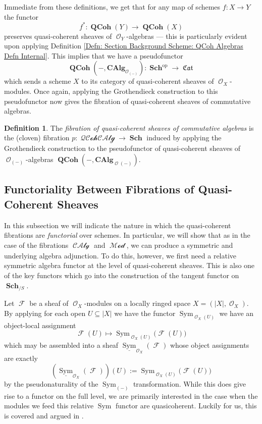 \documentclass{amsart}
\theoremstyle{definition}
\newtheorem{definition}[equation]{Definition}
\DeclareMathOperator{\Fscr}{\mathscr{F}}
\DeclareMathOperator{\Ocal}{\mathcal{O}}
\DeclareMathOperator{\sym}{Sym}
\DeclareMathOperator{\fCat}{\mathfrak{Cat}}
\DeclareMathOperator{\op}{op}
\DeclareMathOperator{\MMod}{\mathcal{Mod}}
\DeclareMathOperator{\CCalg}{\mathcal{CAlg}}
\newcommand{\CAlg}[1]{\mathbf{CAlg}_{#1}}
\newcommand{\Sym}[1]{\sym_{#1}}
\newcommand{\RelSym}[1]{\underline{\sym}_{{#1}}}
\DeclareMathOperator{\Sch}{\mathbf{Sch}}
\DeclareMathOperator{\QCoh}{\mathbf{QCoh}}
\DeclareMathOperator{\QQCAlg}{\mathcal{QCohCAlg}}
\numberwithin{equation}{subsection}
\begin{document}
Immediate from these definitions, we get that for any map of schemes $f:X \to Y$ the functor
\[
f^{\ast}:\QCoh(Y) \to \QCoh(X)
\]
preserves quasi-coherent sheaves of $\Ocal_Y$-algebras --- this is particularly evident upon applying Definition \ref{Defn: Section Background Scheme: QCoh Algebras Defn Internal}. This implies that we have a pseudofunctor
\[
\QCoh\left(-,\CAlg{\Ocal_{(-)}}\right):\Sch^{\op} \to \fCat
\]
which sends a scheme $X$ to its category of quasi-coherent sheaves of $\Ocal_X$-modules. Once again, applying the Grothendieck construction to this pseudofunctor now gives the fibration of quasi-coherent sheaves of commutative algebras.
\begin{definition}
The \emph{fibration of quasi-coherent sheaves of commutative algebras} is the (cloven) fibration $p:\QQCAlg \to \Sch$ induced by applying the Grothendieck construction to the pseudofunctor of quasi-coherent sheaves of $\Ocal_{(-)}$-algebras $\QCoh(-,\CAlg{\Ocal{(-)}})$.
\end{definition}






\subsection{Functoriality Between Fibrations of Quasi-Coherent Sheaves}\label{Subscetion: Functoriality between QCoh and QCoh CAlg}

In this subsection we will indicate the nature in which the quasi-coherent fibrations are \emph{functorial} over schemes. In particular, we will show that as in the case of the fibrations $\CCalg$ and $\MMod$, we can produce a symmetric and underlying algebra adjunction. To do this, however, we first need a relative symmetric algebra functor at the level of quasi-coherent sheaves. This is also one of the key functors which go into the construction of the tangent functor on $\Sch_{/S}$.

Let $\Fscr$ be a sheaf of $\Ocal_X$-modules on a locally ringed space $X = (\lvert X \rvert, \Ocal_X)$. By applying for each open $U \subseteq \lvert X \rvert$ we have the functor $\Sym{\Ocal_X(U)}$ we have an object-local assignment
\[
\Fscr(U) \mapsto \Sym{\Ocal_X(U)}\big(\Fscr(U)\big)
\]
which may be assembled into a sheaf $\RelSym{\Ocal_X}(\Fscr)$ whose object assignments are exactly
\[
\left(\RelSym{\Ocal_X}(\Fscr)\right)(U) := \Sym{\Ocal_X(U)}\big(\Fscr(U)\big)
\] 
by the pseudonaturality of the $\Sym{(-)}$ transformation. While this does give rise to a functor on the full level, we are primarily interested in the case when the modules we feed this relative $\sym$ functor are quasicoherent. Luckily for us, this is covered and argued in \cite{EGA2}.
\end{document}
